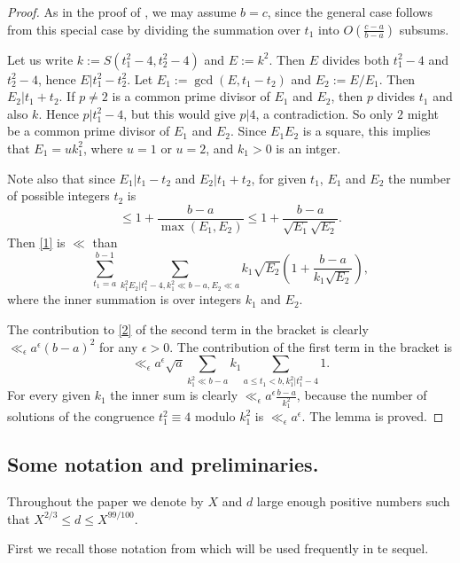 \documentclass[12pt]{amsart}
\theoremstyle{definition}
\numberwithin{equation}{section}
\begin{document}
\begin{proof}As in the proof of \cite[(Lemma 3.5)]{Biro}, we may assume $b=c$, since the general case
follows from this special case by dividing the summation
over $t_1$ into $O\left(\frac {c-a}{b-a}\right)$ subsums.

Let us write $k:=S\left(t_1^2-4,t_2^2-4\right)$ and $E:=k^2$. Then $
E$
divides both $t_1^2-4$ and $t_2^2-4$, hence $E|t_1^2-t_2^2$. Let
$E_1:=\gcd\left(E,t_1-t_2\right)$ and $E_2:=E/E_1$. Then $E_2|t_1
+t_2$. If $p\neq 2$ is a
common prime divisor of $E_1$ and $E_2$, then $p$ divides $t_1$
and also $k$. Hence $p|t_1^2-4$, but this would give $p|4$, a
contradiction. So only $2$ might be a common prime divisor
of $E_1$ and $E_2$. Since $E_1E_2$ is a square, this implies that
$E_1=uk_1^2$, where $u=1$ or $u=2$, and $k_1>0$ is an intger.

Note also that since $E_1|t_1-t_2$ and $E_2|t_1+t_2$, for given $
t_1$,
$E_1$ and $E_2$ the number of possible integers $t_2$ is
\[\le 1+\frac {b-a}{\max\left(E_1,E_2\right)}\le 1+\frac {b-a}{\sqrt {
E_1}\sqrt {E_2}}.\]
Then \eqref{1} is $\ll$ than
\begin{equation}\sum_{t_1=a}^{b-1}\sum_{k_1^2E_2|t_1^2-4,k_1^2\ll
b-a,E_2\ll a}k_1\sqrt {E_2}\left(1+\frac {b-a}{k_1\sqrt {E_2}}\right
),\label{2}\end{equation}
where the inner summation is over integers $k_1$ and $E_2$.

The contribution to \eqref{2} of the second term in the bracket is
clearly $\ll_{\epsilon}a^{\epsilon}\left(b-a\right)^2$ for any $\epsilon
>0$. The contribution of the
first term in the bracket is
\[\ll_{\epsilon}a^{\epsilon}\sqrt {a}\sum_{k_1^2\ll b-a}k_1\sum_{
a\le t_1<b,k_1^2|t_1^2-4}1.\]
For every given $k_1$ the inner sum is clearly $\ll_{\epsilon}a^{
\epsilon}\frac {b-a}{k_1^2}$,
because the number of solutions of the congruence $t_1^2\equiv 4$
modulo $k_1^2$ is $\ll_{\epsilon}a^{\epsilon}$. The lemma is proved.

\end{proof}


\subsection{Some notation and preliminaries.}


Throughout the paper we denote by $X$ and $d$ large enough
positive numbers such that $X^{2/3}\le d\le X^{99/100}$.

First we recall those notation from \cite{Biro} which will be used frequently in te sequel.
\end{document}

